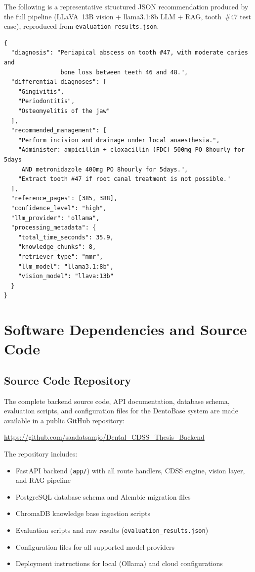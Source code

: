 \documentclass[12pt,a4paper]{report}
\begin{document}
The following is a representative structured JSON recommendation produced
by the full pipeline (LLaVA~13B vision + llama3.1:8b LLM + RAG, tooth~\#47
test case), reproduced from \texttt{evaluation\_results.json}.

\begin{lstlisting}[basicstyle=\ttfamily\footnotesize, breaklines=true,
                   caption={Sample CDSS structured output from evaluation logs.}]
{
  "diagnosis": "Periapical abscess on tooth #47, with moderate caries and
                bone loss between teeth 46 and 48.",
  "differential_diagnoses": [
    "Gingivitis",
    "Periodontitis",
    "Osteomyelitis of the jaw"
  ],
  "recommended_management": [
    "Perform incision and drainage under local anaesthesia.",
    "Administer: ampicillin + cloxacillin (FDC) 500mg PO 8hourly for 5days
     AND metronidazole 400mg PO 8hourly for 5days.",
    "Extract tooth #47 if root canal treatment is not possible."
  ],
  "reference_pages": [385, 388],
  "confidence_level": "high",
  "llm_provider": "ollama",
  "processing_metadata": {
    "total_time_seconds": 35.9,
    "knowledge_chunks": 8,
    "retriever_type": "mmr",
    "llm_model": "llama3.1:8b",
    "vision_model": "llava:13b"
  }
}
\end{lstlisting}

\chapter{Software Dependencies and Source Code}
\label{app:software}

\section{Source Code Repository}

The complete backend source code, API documentation, database schema,
evaluation scripts, and configuration files for the DentoBase system are
made available in a public GitHub repository:

\begin{center}
\url{https://github.com/saadatsamjo/Dental_CDSS_Thesis_Backend}
\end{center}

The repository includes:
\begin{itemize}
  \item FastAPI backend (\texttt{app/}) with all route handlers, CDSS engine,
        vision layer, and RAG pipeline
  \item PostgreSQL database schema and Alembic migration files
  \item ChromaDB knowledge base ingestion scripts
  \item Evaluation scripts and raw results (\texttt{evaluation\_results.json})
  \item Configuration files for all supported model providers
  \item Deployment instructions for local (Ollama) and cloud configurations
\end{itemize}
\end{document}
